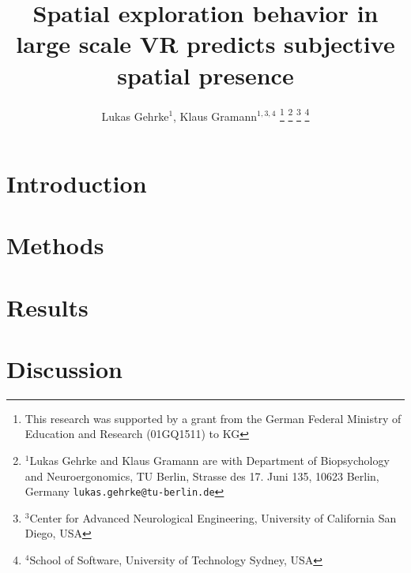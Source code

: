 \documentclass[letterpaper, 10 pt, conference]{ieeeconf}  %
\title{\LARGE \bf Spatial exploration behavior in large scale VR predicts subjective spatial presence}
\author{Lukas Gehrke$^{1}$, Klaus Gramann$^{1,3,4}$%
\thanks{This research was supported by a grant from the German Federal Ministry of Education and Research (01GQ1511) to KG}%
\thanks{$^{1}$Lukas Gehrke and Klaus Gramann are with Department of Biopsychology and Neuroergonomics, TU Berlin, Strasse des 17. Juni 135, 10623 Berlin, Germany
        {\tt\small lukas.gehrke@tu-berlin.de}}%
\thanks{$^{3}$Center for Advanced Neurological Engineering, University of California San Diego, USA}
\thanks{$^{4}$School of Software, University of Technology Sydney, USA}
}
\begin{document}
\maketitle
\thispagestyle{empty}
\pagestyle{empty}

\begin{abstract}

\end{abstract}

\section{Introduction}


\section{Methods}


\section{Results}


\section{Discussion}


\addtolength{\textheight}{-12cm}   %



\end{document}
